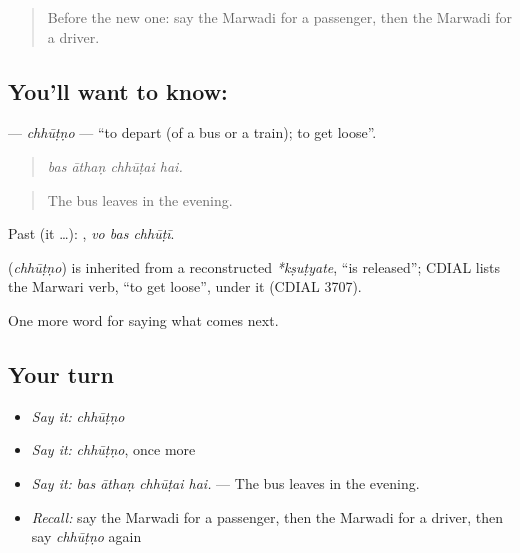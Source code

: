 \begin{quote}
Before the new one: say the Marwadi for a passenger, then the Marwadi for a driver.
\end{quote}

\subsection*{You'll want to know: }
\textbf{} — \emph{chhūṭṇo} — \textquotedblleft{}to depart (of a bus or a train); to get loose\textquotedblright{}.

\begin{quote}
   
\end{quote}

\begin{quote}
\emph{bas āthaṇ chhūṭai hai.}
\end{quote}

\begin{quote}
The bus leaves in the evening.
\end{quote}

Past (it …):   , \emph{vo bas chhūṭī}.

\begin{cousinweb}
\textbf{} (\emph{chhūṭṇo}) is inherited from a reconstructed \emph{*kṣuṭyate}, \textquotedblleft{}is released\textquotedblright{}; CDIAL lists the Marwari verb, \textquotedblleft{}to get loose\textquotedblright{}, under it (CDIAL 3707).
\end{cousinweb}

\begin{grammarlens}[title={What you've built}]
One more word for saying what comes next.
\end{grammarlens}

\subsection*{Your turn}
\begin{itemize}
\raggedright
  \item \emph{Say it:} \emph{chhūṭṇo}
  \item \emph{Say it:} \emph{chhūṭṇo}, once more
  \item \emph{Say it:} \emph{bas āthaṇ chhūṭai hai.} — The bus leaves in the evening.
  \item \emph{Recall:} say the Marwadi for a passenger, then the Marwadi for a driver, then say \emph{chhūṭṇo} again
\end{itemize}

